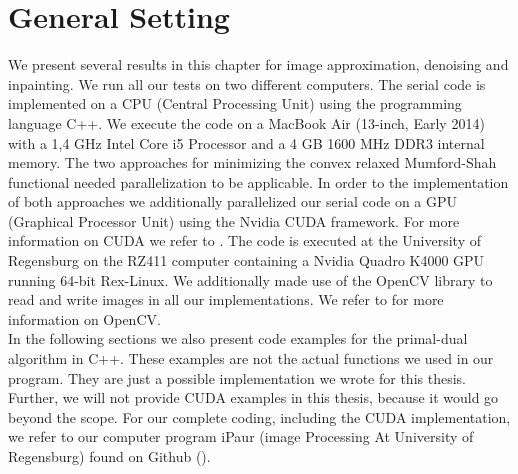 \documentclass[abstracton]{scrreprt}
\begin{document}
    \section{General Setting} %
    \label{sec:general_setting}
        
        We present several results in this chapter for image approximation, denoising and inpainting. We run all our tests on two different computers. The serial code is implemented on a CPU (Central Processing Unit) using the programming language C++. We execute the code on a MacBook Air (13-inch, Early 2014) with a 1,4 GHz Intel Core i5 Processor and a 4 GB 1600 MHz DDR3 internal memory. The two approaches for minimizing the convex relaxed Mumford-Shah functional needed parallelization to be applicable. In order to the implementation of both approaches we additionally parallelized our serial code on a GPU (Graphical Processor Unit) using the Nvidia CUDA framework. For more information on CUDA we refer to \cite{CUDA}. The code is executed at the University of Regensburg on the RZ411 computer containing a Nvidia Quadro K4000 GPU running 64-bit Rex-Linux. We additionally made use of the OpenCV library to read and write images in all our implementations. We refer to \cite{OpenCV} for more information on OpenCV.\\
        In the following sections we also present code examples for the primal-dual algorithm in C++. These examples are not the actual functions we used in our program. They are just a possible implementation we wrote for this thesis. Further, we will not provide CUDA examples in this thesis, because it would go beyond the scope. For our complete coding, including the CUDA implementation, we refer to our computer program iPaur (image Processing At University of Regensburg) found on Github (\cite{Bauer}).
\end{document}
